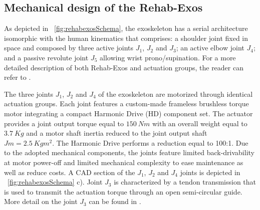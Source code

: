 \subsection{Mechanical design of the Rehab-Exos} 
\label{subsec:mechanicalDesign}
As depicted  in \figurename \ \ref{fig:rehabexosSchema}, the exoskeleton has a serial architecture isomorphic with the human kinematics that comprises: a shoulder joint  fixed in space and composed by three active joints $J_1$, $J_2$ and $J_3$; an active elbow joint $J_4$; and a passive revolute joint $J_5$ allowing  wrist prono/supination.  For a more detailed description of both Rehab-Exos and actuation groups, the reader can refer to \cite{vertechy2009development}.

%
%
%
\par The three joints $J_1$, $J_2$ and $J_4$ of the exoskeleton are motorized through identical actuation groups. Each joint features a custom-made frameless brushless torque motor integrating a compact Harmonic Drive (HD) component set. The actuator provides a joint output torque equal to $150\ Nm$ with an overall weight equal to $3.7\ Kg$ and a motor shaft inertia reduced to the joint output shaft $Jm = 2.5 \ Kgm^2$. The Harmonic Drive performs a reduction equal to 100:1. Due to the adopted mechanical components, the joints feature limited back-drivability at motor power-off and limited mechanical complexity to ease maintenance as well as reduce costs. A CAD section of the $J_1$, $J_2$ and $J_4$ joints is depicted in \figurename \ \ref{fig:rehabexosSchema} c).
Joint $J_3$ is characterized by a tendon transmission that is used to transmit the actuation torque through an open semi-circular guide. More detail on the joint $J_3$ can be found in \cite{vertechy2009development}.

